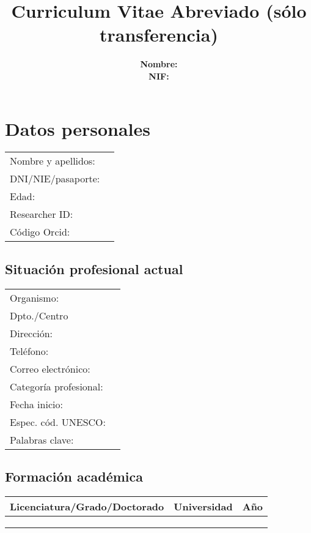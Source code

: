 \documentclass[a4paper]{article}
\title{Curriculum Vitae Abreviado (sólo transferencia)}
\author{
  \begin{tabular}{ll}
    \textbf{Nombre:} &  \\
    \textbf{NIF:} & 
  \end{tabular}
}
\begin{document}
\def\normalfont{\sffamily}
\sffamily
\maketitle

\section{Datos personales}
\begin{tabular}{ll}
  Nombre y apellidos: &   \\
  DNI/NIE/pasaporte: &  \\
  Edad: &  \\
  Researcher ID: &  \\
  Código Orcid: & 
\end{tabular}

\subsection{Situación profesional actual}

\begin{tabular}{ll}
  Organismo: &  \\
  Dpto./Centro &  \\
  Dirección: &  \\
  Teléfono: &  \\
  Correo electrónico: &  \\
  Categoría profesional: &  \\
  Fecha inicio: &  \\
  Espec. cód. UNESCO: &  \\
  Palabras clave: & 
\end{tabular}

\subsection{Formación académica}

\begin{tabular}{lll}
  Licenciatura/Grado/Doctorado & Universidad & Año \\
  \hline
   &  &  \\
   &  &  \\
   &  & 
\end{tabular}
\end{document}
